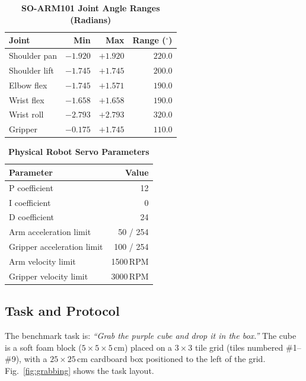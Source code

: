 \documentclass{ieeeaccess}
\begin{document}
\begin{table}[t]
\caption{\textbf{SO-ARM101 Joint Angle Ranges (Radians)}}
\label{tab:joints}
\centering
\begin{tabular}{lrrr}
\hline
\textbf{Joint} & \textbf{Min} & \textbf{Max} & \textbf{Range ($^{\circ}$)} \\
\hline
Shoulder pan   & $-1.920$ & $+1.920$ & $220.0$ \\
Shoulder lift  & $-1.745$ & $+1.745$ & $200.0$ \\
Elbow flex     & $-1.745$ & $+1.571$ & $190.0$ \\
Wrist flex     & $-1.658$ & $+1.658$ & $190.0$ \\
Wrist roll     & $-2.793$ & $+2.793$ & $320.0$ \\
Gripper        & $-0.175$ & $+1.745$ & $110.0$ \\
\hline
\end{tabular}
\end{table}

\begin{table}[t]
\caption{\textbf{Physical Robot Servo Parameters}}
\label{tab:servo}
\centering
\begin{tabular}{lr}
\hline
\textbf{Parameter} & \textbf{Value} \\
\hline
P coefficient               & 12 \\
I coefficient               & 0 \\
D coefficient               & 24 \\
Arm acceleration limit      & 50 / 254 \\
Gripper acceleration limit  & 100 / 254 \\
Arm velocity limit          & 1500\,RPM \\
Gripper velocity limit      & 3000\,RPM \\
\hline
\end{tabular}
\end{table}

\subsection{Task and Protocol}
\label{sec:task}

The benchmark task is: \emph{``Grab the purple cube and drop it in the
box.''} The cube is a soft foam block ($5 \times 5 \times 5$\,cm) placed
on a $3 \times 3$ tile grid (tiles numbered \#1--\#9), with a
$25 \times 25$\,cm cardboard box positioned to the left of the grid.
Fig.~\ref{fig:grabbing} shows the task layout.
\end{document}

